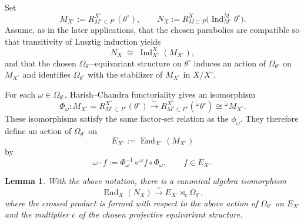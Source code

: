 \documentclass{amsart}
\theoremstyle{plain}
\numberwithin{equation}{section}
\newtheorem{lemma}[theorem]{Lemma}
\theoremstyle{definition}
\newcommand{\Ind}{\operatorname{Ind}}
\newcommand{\End}{\operatorname{End}}
\begin{document}
Set
\[
M_{X^\circ}:=R^{X^\circ}_{M^\circ\subset P^\circ}(\theta^\circ),
\qquad
N_X:=R^X_{M\subset P}\!\bigl(\Ind_{M^\circ}^{M}\theta^\circ\bigr).
\]
Assume, as in the later applications, that the chosen parabolics are compatible so that
transitivity of Lusztig induction yields
\[
N_X
\;\cong\;
\Ind_{X^\circ}^{X}(M_{X^\circ}),
\]
and that the chosen $\Omega_{\theta^\circ}$--equivariant structure on $\theta^\circ$
induces an action of $\Omega_{\theta^\circ}$ on $M_{X^\circ}$ and identifies
$\Omega_{\theta^\circ}$ with the stabilizer of $M_{X^\circ}$ in $X/X^\circ$.

For each $\omega\in \Omega_{\theta^\circ}$, Harish--Chandra functoriality gives an
isomorphism
\[
\Phi_\omega:
M_{X^\circ}
=
R^{X^\circ}_{M^\circ\subset P^\circ}(\theta^\circ)
\xrightarrow{\ \sim\ }
R^{X^\circ}_{M^\circ\subset P^\circ}({}^{\dot\omega}\theta^\circ)
\cong
{}^{\dot\omega}M_{X^\circ}.
\]
These isomorphisms satisfy the same factor-set relation as the $\phi_\omega$.
They therefore define an action of $\Omega_{\theta^\circ}$ on
\[
E_{X^\circ}:=\End_{X^\circ}(M_{X^\circ})
\]
by
\[
\omega\cdot f
:=
\Phi_\omega^{-1}\circ {}^{\dot\omega}\!f\circ \Phi_\omega,
\qquad f\in E_{X^\circ}.
\]

\begin{lemma}\label{lem:semisimple-crossed-product}
With the above notation, there is a canonical algebra isomorphism
\[
\End_X(N_X)\xrightarrow{\sim} E_{X^\circ}\rtimes_c \Omega_{\theta^\circ},
\]
where the crossed product is formed with respect to the above action of
$\Omega_{\theta^\circ}$ on $E_{X^\circ}$ and the multiplier $c$ of the chosen
projective equivariant structure.
\end{lemma}
\end{document}
